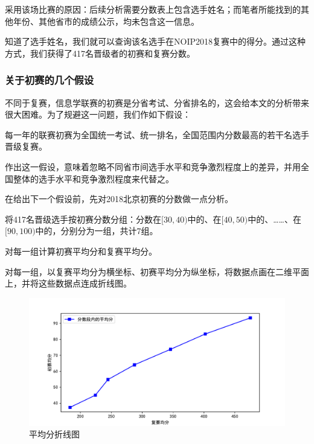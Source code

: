             采用该场比赛的原因：后续分析需要分数表上包含选手姓名；而笔者所能找到的其他年份、其他省市的成绩公示，均未包含这一信息。

            知道了选手姓名，我们就可以查询该名选手在NOIP2018复赛中的得分。通过这种方式，我们获得了417名晋级者的初赛和复赛分数。

        \subsubsection{关于初赛的几个假设}\label{sec:assumptionsOnPreliminaryRound}

            不同于复赛，信息学联赛的初赛是分省考试、分省排名的，这会给本文的分析带来很大困难。为了规避这一问题，我们作如下假设：

            \begin{assumption}
                每一年的联赛初赛为全国统一考试、统一排名，全国范围内分数最高的若干名选手晋级复赛。

                \label{ass:preliminaryRoundsOfAllProvincesUnite}
            \end{assumption}

            作出这一假设，意味着忽略不同省市间选手水平和竞争激烈程度上的差异，并用全国整体的选手水平和竞争激烈程度来代替之。

            \vspace{1.5ex}

            在给出下一个假设前，先对2018北京初赛的分数做一点分析。

            \begin{asparaenum}[\bfseries{步骤} 1.]
                \item 将417名晋级选手按初赛分数分组：分数在$[30,40)$中的、在$[40,50)$中的、……、在$[90,100)$中的，分别分为一组，共计7组。
                \item 对每一组计算初赛平均分和复赛平均分。
                \item 对每一组，以复赛平均分为横坐标、初赛平均分为纵坐标，将数据点画在二维平面上，并将这些数据点连成折线图。
            \end{asparaenum}

            \begin{figure}
                \centering
                \includegraphics[width=\textwidth]{fig/plottingAvgScores.pdf}
                \caption{平均分折线图}
                \label{fig:plottingAvgScores}
            \end{figure}

